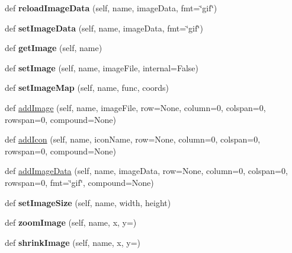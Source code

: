 \begin{DoxyCompactItemize}
\mbox{\label{classappjar_1_1gui_a3f122db3e77bd7e308e11b9a0c255472}} 
def {\bfseries reload\+Image\+Data} (self, name, image\+Data, fmt=\char`\"{}gif\char`\"{})
\item 
\mbox{\label{classappjar_1_1gui_adb215908e1e3341d1c4614f81fc6debd}} 
def {\bfseries set\+Image\+Data} (self, name, image\+Data, fmt=\char`\"{}gif\char`\"{})
\item 
\mbox{\label{classappjar_1_1gui_a83b1c5208f7ed33efbedda2f93cb2fbc}} 
def {\bfseries get\+Image} (self, name)
\item 
\mbox{\label{classappjar_1_1gui_a68f25f1006e94e974c703cb6bc1937c6}} 
def {\bfseries set\+Image} (self, name, image\+File, internal=False)
\item 
\mbox{\label{classappjar_1_1gui_ac3e072a0228475d6bb0bf738bc9dbbd1}} 
def {\bfseries set\+Image\+Map} (self, name, func, coords)
\item 
def \hyperlink{classappjar_1_1gui_aab755e0cfb436daccfd914e834c01c53}{add\+Image} (self, name, image\+File, row=None, column=0, colspan=0, rowspan=0, compound=None)
\item 
def \hyperlink{classappjar_1_1gui_a1e90146f29426baaa5aeb116d89a5e8c}{add\+Icon} (self, name, icon\+Name, row=None, column=0, colspan=0, rowspan=0, compound=None)
\item 
def \hyperlink{classappjar_1_1gui_ae403da2821d7cccce17f84c71df0b2c3}{add\+Image\+Data} (self, name, image\+Data, row=None, column=0, colspan=0, rowspan=0, fmt=\char`\"{}gif\char`\"{}, compound=None)
\item 
\mbox{\label{classappjar_1_1gui_a33b7228aa53041ea68cc659045cada7b}} 
def {\bfseries set\+Image\+Size} (self, name, width, height)
\item 
\mbox{\label{classappjar_1_1gui_a9b3deaf3d8284dc126c1f6966c061b8e}} 
def {\bfseries zoom\+Image} (self, name, x, y=\textquotesingle{}\textquotesingle{})
\item 
\mbox{\label{classappjar_1_1gui_a0286b1d4780d0cd016f1e1832056c393}} 
def {\bfseries shrink\+Image} (self, name, x, y=\textquotesingle{}\textquotesingle{})

\end{DoxyCompactItemize}
